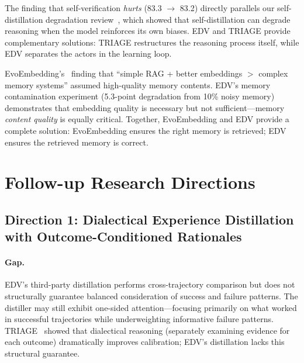 \documentclass[11pt,a4paper]{article}
\begin{document}
The finding that self-verification \emph{hurts} (83.3 $\to$ 83.2) directly parallels our self-distillation degradation review~\cite{wang2026selfdistill}, which showed that self-distillation can degrade reasoning when the model reinforces its own biases. EDV and TRIAGE provide complementary solutions: TRIAGE restructures the reasoning process itself, while EDV separates the actors in the learning loop.

EvoEmbedding's~\cite{nie2026evoembedding} finding that ``simple RAG + better embeddings $>$ complex memory systems'' assumed high-quality memory contents. EDV's memory contamination experiment (5.3-point degradation from 10\% noisy memory) demonstrates that embedding quality is necessary but not sufficient---memory \emph{content quality} is equally critical. Together, EvoEmbedding and EDV provide a complete solution: EvoEmbedding ensures the right memory is retrieved; EDV ensures the retrieved memory is correct.

\section{Follow-up Research Directions}

\subsection{Direction 1: Dialectical Experience Distillation with Outcome-Conditioned Rationales}

\paragraph{Gap.} EDV's third-party distillation performs cross-trajectory comparison but does not structurally guarantee balanced consideration of success and failure patterns. The distiller may still exhibit one-sided attention---focusing primarily on what worked in successful trajectories while underweighting informative failure patterns. TRIAGE~\cite{jang2026triage} showed that dialectical reasoning (separately examining evidence for each outcome) dramatically improves calibration; EDV's distillation lacks this structural guarantee.
\end{document}
